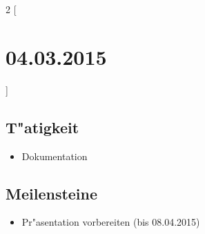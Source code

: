 \documentclass[11pt,a4paper]{article}
\begin{document}
\begin{multicols}{2}
[\section*{  04.03.2015  }] 

\subsection*{T"atigkeit}
\begin{itemize}
\item Dokumentation
\end{itemize}

\columnbreak

\subsection*{Meilensteine}

\begin{itemize}
\item Pr"asentation vorbereiten (bis 08.04.2015)
\end{itemize}

\end{multicols}
\end{document}

